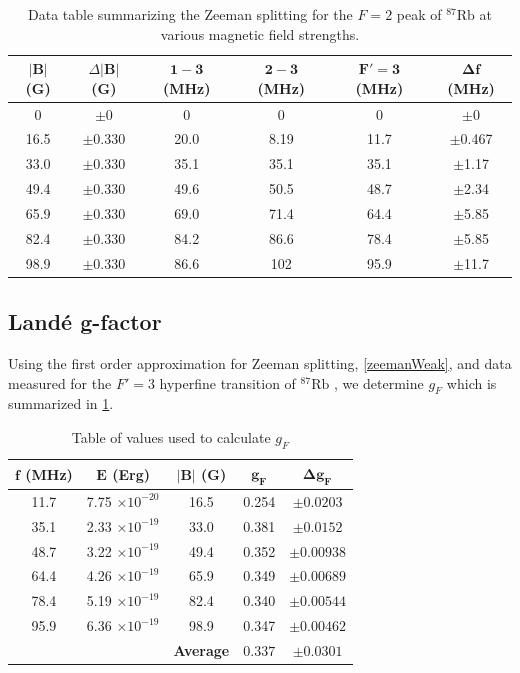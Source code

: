 \documentclass[12pt]{article}
\newcommand{\RbES}{$^{87}\text{Rb}$ }
\begin{document}
	
	\begin{table}[H]
		\centering
		\begin{tabular}{c c c c c c}
			\toprule
			\textbf{$|\mathbf{B}|$ (G)} & \textbf{$\Delta |\mathbf{B}|$ (G)} & \textbf{$\mathbf{1-3}$ (MHz)} & \textbf{$\mathbf{2-3}$ (MHz)} & $\mathbf{F'=3}$ \textbf{(MHz)} & \textbf{$\mathbf{\Delta f}$ (MHz)} \\ \midrule
			0    & $\pm$0     & 0    & 0    & 0    & $\pm$0 \\ 
			16.5 & $\pm$0.330 & 20.0 & 8.19 & 11.7 & $\pm$0.467 \\ 
			33.0 & $\pm$0.330 & 35.1 & 35.1 & 35.1 & $\pm$1.17 \\ 
			49.4 & $\pm$0.330 & 49.6 & 50.5 & 48.7 & $\pm$2.34 \\
			65.9 & $\pm$0.330 & 69.0 & 71.4 & 64.4 & $\pm$5.85 \\
			82.4 & $\pm$0.330 & 84.2 & 86.6 & 78.4 & $\pm$5.85 \\
			98.9 & $\pm$0.330 & 86.6 & 102  & 95.9 & $\pm$11.7 \\ \bottomrule
		\end{tabular}
	\caption{Data table summarizing the Zeeman splitting for the $F=2$ peak of \RbES at various magnetic field strengths.}
	\end{table}

	\subsection{Land\'e g-factor}
	Using the first order approximation for Zeeman splitting,  \cref{zeemanWeak}, and data measured for the $F'=3$ hyperfine transition of \RbES, we determine $g_F$ which is summarized in \cref{LandeTable}.

	\begin{table}[H]
		\centering
		\begin{tabular}{c c c c c} 
			\toprule
			$\mathbf{f}$ \textbf{(MHz)} & $\mathbf{E}$ \textbf{(Erg)} & $\mathbf{|B|}$ \textbf{(G)} & $\mathbf{g_F}$ & $\bm{\Delta} \mathbf{g_F}$  \\ \midrule
			11.7 & 7.75 $\times 10^{-20}$ & 16.5 & 0.254 & $\pm 0.0203$ \\
			35.1 & 2.33 $\times 10^{-19}$ & 33.0 & 0.381 & $\pm 0.0152$ \\
			48.7 & 3.22 $\times 10^{-19}$ & 49.4 & 0.352 & $\pm 0.00938$ \\
			64.4 & 4.26 $\times 10^{-19}$ & 65.9 & 0.349 & $\pm 0.00689$ \\
			78.4 & 5.19 $\times 10^{-19}$ & 82.4 & 0.340 & $\pm 0.00544$ \\
			95.9 & 6.36 $\times 10^{-19}$ & 98.9 & 0.347 & $\pm 0.00462$ \\
			&            & \textbf{Average} & $\mathbf{0.337}$ & $\mathbf{\pm 0.0301}$ \\ \bottomrule
		\end{tabular} 
		\caption{Table of values used to calculate $g_F$}
		\label{LandeTable}
	\end{table}
	
\end{document}
